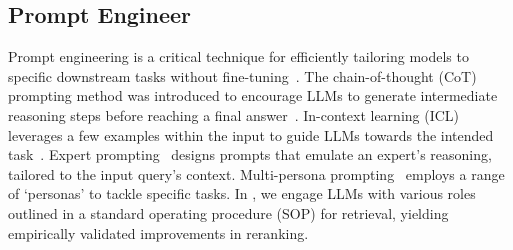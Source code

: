 \subsection{Prompt Engineer}
Prompt engineering is a critical technique for efficiently tailoring models to specific downstream tasks without fine-tuning~\citep{liu2023pre, brown2020language, zhou2022conditional,jin2023visual,zhou2024adapi,zhang2023online,zhang2022stochastic,zhao2024a}. The chain-of-thought (CoT) prompting method was introduced to encourage LLMs to generate intermediate reasoning steps before reaching a final answer~\citep{kojima2022large, wei2022chain}. In-context learning (ICL) leverages a few examples within the input to guide LLMs towards the intended task~\citep{radford2019language, liu2022few}. Expert prompting~\citep{xu2023expertprompting} designs prompts that emulate an expert's reasoning, tailored to the input query's context. Multi-persona prompting~\citep{du2023improving} employs a range of `personas' to tackle specific tasks. In \ours, we engage LLMs with various roles outlined in a standard operating procedure (SOP) for retrieval, yielding empirically validated improvements in reranking.